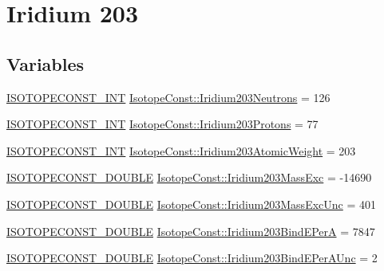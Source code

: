 \hypertarget{group___isotope_const-_iridium-_ir203}{}\section{Iridium 203}
\label{group___isotope_const-_iridium-_ir203}
\subsection*{Variables}
\begin{DoxyCompactItemize}
\item 
\mbox{\hyperlink{group___isotope_const-_macros_ga5f18360b3e99483a35c32d789e62621c}{I\+S\+O\+T\+O\+P\+E\+C\+O\+N\+S\+T\+\_\+\+I\+NT}} \mbox{\hyperlink{group___isotope_const-_iridium-_ir203_ga4744d47501506750495225474ef55b28}{Isotope\+Const\+::\+Iridium203\+Neutrons}} = 126
\item 
\mbox{\hyperlink{group___isotope_const-_macros_ga5f18360b3e99483a35c32d789e62621c}{I\+S\+O\+T\+O\+P\+E\+C\+O\+N\+S\+T\+\_\+\+I\+NT}} \mbox{\hyperlink{group___isotope_const-_iridium-_ir203_gab9c223dd693c5fa0d69a975171743780}{Isotope\+Const\+::\+Iridium203\+Protons}} = 77
\item 
\mbox{\hyperlink{group___isotope_const-_macros_ga5f18360b3e99483a35c32d789e62621c}{I\+S\+O\+T\+O\+P\+E\+C\+O\+N\+S\+T\+\_\+\+I\+NT}} \mbox{\hyperlink{group___isotope_const-_iridium-_ir203_gafc3aa42ce1d4dafe5dd6783132e7a1ec}{Isotope\+Const\+::\+Iridium203\+Atomic\+Weight}} = 203
\item 
\mbox{\hyperlink{group___isotope_const-_macros_ga8f45a7272ce02c0b4c65c44636ed719a}{I\+S\+O\+T\+O\+P\+E\+C\+O\+N\+S\+T\+\_\+\+D\+O\+U\+B\+LE}} \mbox{\hyperlink{group___isotope_const-_iridium-_ir203_gac1d015feb7325c1d7585ae3067e2db6f}{Isotope\+Const\+::\+Iridium203\+Mass\+Exc}} = -\/14690
\item 
\mbox{\hyperlink{group___isotope_const-_macros_ga8f45a7272ce02c0b4c65c44636ed719a}{I\+S\+O\+T\+O\+P\+E\+C\+O\+N\+S\+T\+\_\+\+D\+O\+U\+B\+LE}} \mbox{\hyperlink{group___isotope_const-_iridium-_ir203_gaf4f49d367fb7ea237290565e063a7248}{Isotope\+Const\+::\+Iridium203\+Mass\+Exc\+Unc}} = 401
\item 
\mbox{\hyperlink{group___isotope_const-_macros_ga8f45a7272ce02c0b4c65c44636ed719a}{I\+S\+O\+T\+O\+P\+E\+C\+O\+N\+S\+T\+\_\+\+D\+O\+U\+B\+LE}} \mbox{\hyperlink{group___isotope_const-_iridium-_ir203_gac24e9e6d7fcadedd813554593f83cd5f}{Isotope\+Const\+::\+Iridium203\+Bind\+E\+PerA}} = 7847
\item 
\mbox{\hyperlink{group___isotope_const-_macros_ga8f45a7272ce02c0b4c65c44636ed719a}{I\+S\+O\+T\+O\+P\+E\+C\+O\+N\+S\+T\+\_\+\+D\+O\+U\+B\+LE}} \mbox{\hyperlink{group___isotope_const-_iridium-_ir203_ga6c5af186b5cc362134aaeace6c26acb3}{Isotope\+Const\+::\+Iridium203\+Bind\+E\+Per\+A\+Unc}} = 2

\end{DoxyCompactItemize}
